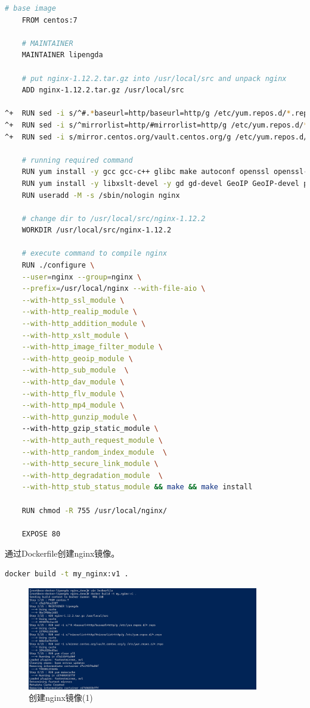 \documentclass{article}
\begin{document}
\begin{lstlisting}[language=bash]
    # base image
    FROM centos:7
    
    # MAINTAINER
    MAINTAINER lipengda
    
    # put nginx-1.12.2.tar.gz into /usr/local/src and unpack nginx
    ADD nginx-1.12.2.tar.gz /usr/local/src

^+  RUN sed -i s/^#.*baseurl=http/baseurl=http/g /etc/yum.repos.d/*.repo
^+  RUN sed -i s/^mirrorlist=http/#mirrorlist=http/g /etc/yum.repos.d/*.repo
^+  RUN sed -i s/mirror.centos.org/vault.centos.org/g /etc/yum.repos.d/*.repo

    # running required command
    RUN yum install -y gcc gcc-c++ glibc make autoconf openssl openssl-devel 
    RUN yum install -y libxslt-devel -y gd gd-devel GeoIP GeoIP-devel pcre pcre-devel
    RUN useradd -M -s /sbin/nologin nginx
    
    # change dir to /usr/local/src/nginx-1.12.2
    WORKDIR /usr/local/src/nginx-1.12.2
    
    # execute command to compile nginx
    RUN ./configure \
    --user=nginx --group=nginx \
    --prefix=/usr/local/nginx --with-file-aio \
    --with-http_ssl_module \
    --with-http_realip_module \
    --with-http_addition_module \
    --with-http_xslt_module \
    --with-http_image_filter_module \
    --with-http_geoip_module \
    --with-http_sub_module  \
    --with-http_dav_module \
    --with-http_flv_module \
    --with-http_mp4_module \
    --with-http_gunzip_module \ 
    --with-http_gzip_static_module \
    --with-http_auth_request_module \
    --with-http_random_index_module  \
    --with-http_secure_link_module \
    --with-http_degradation_module  \
    --with-http_stub_status_module && make && make install
    
    RUN chmod -R 755 /usr/local/nginx/
    
    EXPOSE 80
\end{lstlisting}

通过Dockerfile创建nginx镜像。

\begin{lstlisting}[language=bash]
    docker build -t my_nginx:v1 .
\end{lstlisting}

\begin{figure}[H]
\centering
\includegraphics[width=0.9\textwidth]{img/2.7.1.3.1.png}
\caption{创建nginx镜像(1)}
\end{figure}
\end{document}
